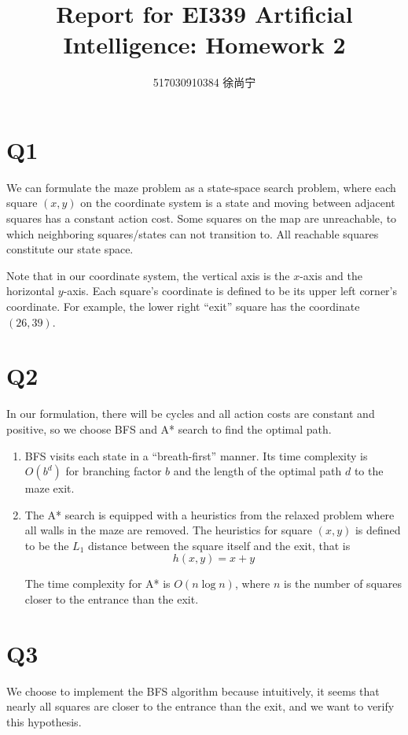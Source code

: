 \documentclass[a4paper]{article}
\title{Report for EI339 Artificial Intelligence: Homework 2}
\author{517030910384 徐尚宁}
\date{}
\begin{document}
\begin{CJK}{UTF8}{gbsn}
    \maketitle
\end{CJK}

\section*{Q1}

We can formulate the maze problem as a state-space search problem, where each
square $(x, y)$ on the coordinate system is a state and moving between adjacent
squares has a constant action cost. Some squares on the map are unreachable, to
which neighboring squares/states can not transition to. All reachable squares
constitute our state space.

Note that in our coordinate system, the vertical axis is the $x$-axis and the
horizontal $y$-axis. Each square's coordinate is defined to be its upper left
corner's coordinate. For example, the lower right ``exit'' square has the
coordinate $(26, 39)$.

\section*{Q2}

In our formulation, there will be cycles and all action costs are constant and
positive, so we choose BFS and A* search to find the optimal path.
\begin{enumerate}
    \item BFS visits each state in a ``breath-first'' manner. Its time
    complexity is $O(b^d)$ for branching factor $b$ and the length of the
    optimal path $d$ to the maze exit.
    \item The A* search is equipped with a heuristics from the relaxed problem
    where all walls in the maze are removed. The heuristics for square $(x, y)$
    is defined to be the $L_1$ distance between the square itself and the exit,
    that is
    \[
        h(x, y) = x + y
    \]

    The time complexity for A* is $O(n\log n)$, where $n$ is the number of
    squares closer to the entrance than the exit.
\end{enumerate}

\section*{Q3}

We choose to implement the BFS algorithm because intuitively, it seems that
nearly all squares are closer to the entrance than the exit, and we want to
verify this hypothesis.
\end{document}
